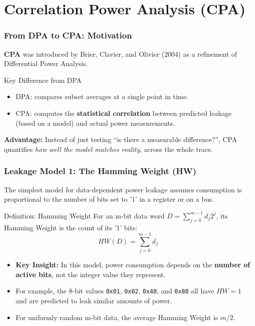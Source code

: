 

\section{Correlation Power Analysis (CPA)}

\begin{frame}
    \frametitle{From DPA to CPA: Motivation}

    \textbf{CPA} was introduced by Brier, Clavier, and Olivier (2004) as a refinement of Differential Power Analysis. 
    
    \begin{block}{Key Difference from DPA}
        \begin{itemize}
            \item DPA: compares subset averages at a single point in time.
            \item CPA: computes the \textbf{statistical correlation} between predicted leakage
                  (based on a model) and actual power measurements.
        \end{itemize}
    \end{block}
    \vspace{2mm}
    \textbf{Advantage:} Instead of just testing “is there a measurable difference?”, CPA quantifies
    \textit{how well the model matches reality}, across the whole trace.
\end{frame}

\begin{frame}
    \frametitle{Leakage Model 1: The Hamming Weight (HW)}

    The simplest model for data-dependent power leakage assumes consumption is proportional to the number of bits set to '1' in a register or on a bus.

    \begin{block}{Definition: Hamming Weight}
        For an m-bit data word $D = \sum_{j=0}^{m-1} d_j 2^j$, its Hamming Weight is the count of its '1' bits:
        \[
            HW(D) = \sum_{j=0}^{m-1} d_j
        \]
    \end{block}

    \begin{itemize}
        \item \textbf{Key Insight:} In this model, power consumption depends on the \textbf{number of active bits}, not the integer value they represent.
        \item For example, the 8-bit values \texttt{0x01}, \texttt{0x02}, \texttt{0x40}, and \texttt{0x80} all have $HW=1$ and are predicted to leak similar amounts of power.
        \item For uniformly random m-bit data, the average Hamming Weight is $m/2$.
    \end{itemize}
\end{frame}

